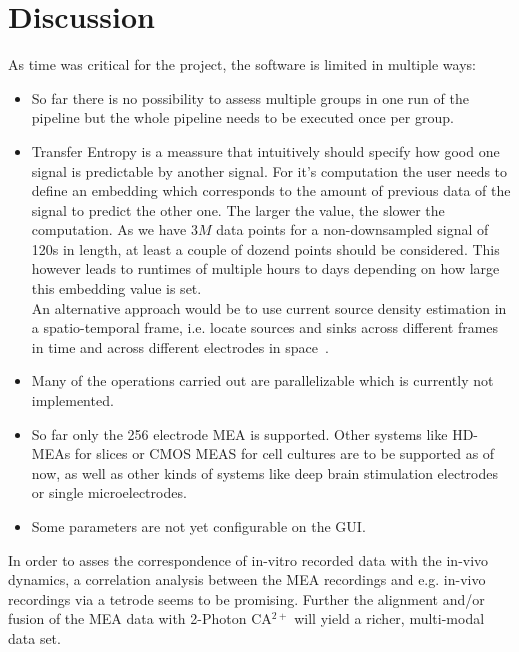 \documentclass[11pt, twocolumn]{article}
\begin{document}
\section{Discussion}
As time was critical for the project, the software is limited in multiple ways:
\begin{itemize}
 \item So far there is no possibility to assess multiple groups in one run of the pipeline but the whole pipeline needs to be executed once per group.
 \item Transfer Entropy is a meassure that intuitively should specify how good one signal is predictable by another signal.
 For it's computation the user needs to define an embedding which corresponds to the amount of previous data of the signal to predict the other one.
 The larger the value, the slower the computation.
 As we have $3M$ data points for a non-downsampled signal of 120s in length, at least a couple of dozend points should be considered.
 This however leads to runtimes of multiple hours to days depending on how large this embedding value is set. \\
 An alternative approach would be to use current source density estimation in a spatio-temporal frame, i.e. locate sources and sinks across different frames in time and across different electrodes in space~\autocite{nicholson1975theory}.
 \item Many of the operations carried out are parallelizable which is currently not implemented.
 \item So far only the 256 electrode MEA is supported. Other systems like HD-MEAs for slices or CMOS MEAS for cell cultures are to be supported as of now, as well as other kinds of systems like deep brain stimulation electrodes or single microelectrodes.
 \item Some parameters are not yet configurable on the GUI.
\end{itemize}
In order to asses the correspondence of in-vitro recorded data with the in-vivo dynamics, a correlation analysis between the MEA recordings and e.g. in-vivo recordings via a tetrode seems to be promising.
Further the alignment and/or fusion of the MEA data with 2-Photon CA$^{2+}$ will yield a richer, multi-modal data set.
\end{document}
